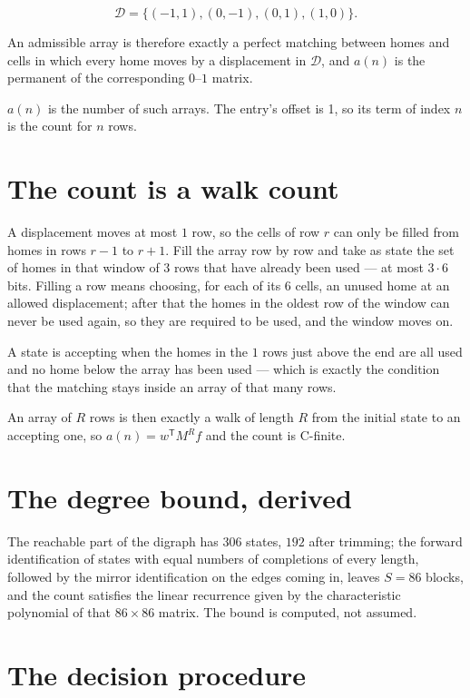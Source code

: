 \documentclass[11pt]{article}
\theoremstyle{definition}
\begin{document}
\[\mathcal{D} = \{(-1,1), (0,-1), (0,1), (1,0)\}.\]

An admissible array is therefore exactly a perfect matching between homes and cells in which every home moves by a displacement in $\mathcal{D}$, and $a(n)$ is the permanent of the corresponding $0$--$1$ matrix.

$a(n)$ is the number of such arrays. The entry's offset is 1, so its term of index $n$ is the count for $n$ rows.

\section{The count is a walk count}

A displacement moves at most $1$ row, so the cells of row $r$ can only be filled from homes in rows $r-1$ to $r+1$. Fill the array row by row and take as state the set of homes in that window of $3$ rows that have already been used --- at most $3\cdot6$ bits. Filling a row means choosing, for each of its $6$ cells, an unused home at an allowed displacement; after that the homes in the oldest row of the window can never be used again, so they are required to be used, and the window moves on.

A state is accepting when the homes in the $1$ rows just above the end are all used and no home below the array has been used --- which is exactly the condition that the matching stays inside an array of that many rows.

An array of $R$ rows is then exactly a walk of length $R$ from the initial state to an accepting one, so $a(n) = w^{\mathsf T}M^{R}f$ and the count is C-finite.

\section{The degree bound, derived}

The reachable part of the digraph has $306$ states, $192$ after trimming; the forward identification of states with equal numbers of completions of every length, followed by the mirror identification on the edges coming in, leaves $S = 86$ blocks, and the count satisfies the linear recurrence given by the characteristic polynomial of that $86\times86$ matrix. The bound is computed, not assumed.

\section{The decision procedure}
\end{document}
